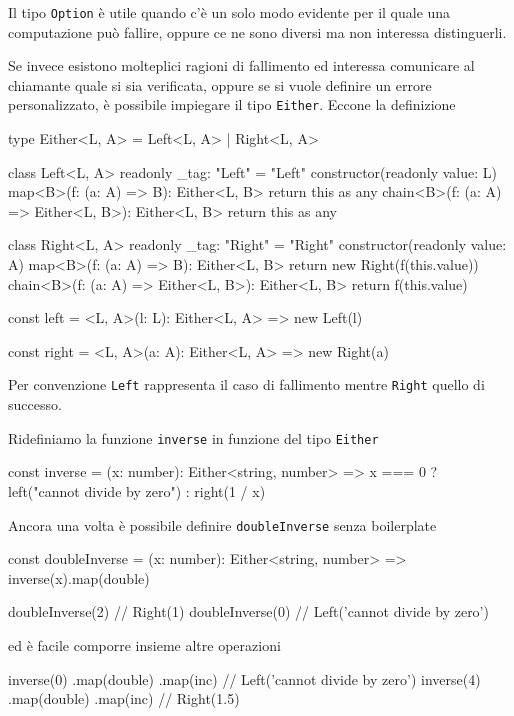 \documentclass[12pt]{article}
\theoremstyle{definition}
\newenvironment{code}
  {\vspace{0.5cm} \VerbatimEnvironment\begin{typescriptcode}}
  {\end{typescriptcode} \vspace{0.2cm}}
\begin{document}
Il tipo \texttt{Option} è utile quando c'è un solo modo evidente per il quale una computazione può fallire,
oppure ce ne sono diversi ma non interessa distinguerli.

Se invece esistono molteplici ragioni di fallimento ed interessa comunicare al chiamante quale si sia verificata,
oppure se si vuole definire un errore personalizzato, è possibile impiegare il tipo \texttt{Either}. Eccone la definizione

\begin{code}
type Either<L, A> = Left<L, A> | Right<L, A>

class Left<L, A> {
  readonly _tag: "Left" = "Left"
  constructor(readonly value: L) {}
  map<B>(f: (a: A) => B): Either<L, B> {
    return this as any
  }
  chain<B>(f: (a: A) => Either<L, B>): Either<L, B> {
    return this as any
  }
}

class Right<L, A> {
  readonly _tag: "Right" = "Right"
  constructor(readonly value: A) {}
  map<B>(f: (a: A) => B): Either<L, B> {
    return new Right(f(this.value))
  }
  chain<B>(f: (a: A) => Either<L, B>): Either<L, B> {
    return f(this.value)
  }
}

const left = <L, A>(l: L): Either<L, A> =>
  new Left(l)

const right = <L, A>(a: A): Either<L, A> =>
  new Right(a)
\end{code}

Per convenzione \texttt{Left} rappresenta il caso di fallimento mentre \texttt{Right} quello di successo.

Ridefiniamo la funzione \texttt{inverse} in funzione del tipo \texttt{Either}

\begin{code}
const inverse = (x: number): Either<string, number> =>
  x === 0 ? left("cannot divide by zero") : right(1 / x)
\end{code}

Ancora una volta è possibile definire \texttt{doubleInverse} senza boilerplate

\begin{code}
const doubleInverse = (x: number): Either<string, number> =>
  inverse(x).map(double)

doubleInverse(2) // Right(1)
doubleInverse(0) // Left('cannot divide by zero')
\end{code}

ed è facile comporre insieme altre operazioni

\begin{code}
inverse(0)
  .map(double)
  .map(inc) // Left('cannot divide by zero')
inverse(4)
  .map(double)
  .map(inc) // Right(1.5)
\end{code}
\end{document}
